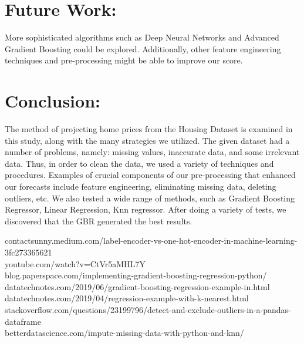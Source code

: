 \documentclass[10pt,twocolumn,letterpaper]{article}
\begin{document}
\section{Future Work:}
More sophisticated algorithms such as Deep Neural Networks and Advanced Gradient Boosting could be explored. Additionally, other feature engineering techniques and pre-processing might be able to improve our score. 


\section{Conclusion:}
The method of projecting home prices from the Housing Dataset is examined in this study, along with the many strategies we utilized. The given dataset had a number of problems, namely: missing values, inaccurate data, and some irrelevant data. Thus, in order to clean the data, we used a variety of techniques and procedures. Examples of crucial components of our pre-processing that enhanced our forecasts include feature engineering, eliminating missing data, deleting outliers, etc. We also tested a wide range of methods, such as Gradient Boosting Regressor, Linear Regression, Knn regressor. After doing a variety of tests, we discovered that the GBR generated the best results. 



contactsunny.medium.com/label-encoder-vs-one-hot-encoder-in-machine-learning-3fc273365621\\

youtube.com/watch?v=CtVr5aMHL7Y\\

blog.paperspace.com/implementing-gradient-boosting-regression-python/\\

datatechnotes.com/2019/06/gradient-boosting-regression-example-in.html\\

datatechnotes.com/2019/04/regression-example-with-k-nearest.html\\

stackoverflow.com/questions/23199796/detect-and-exclude-outliers-in-a-pandas-dataframe\\

betterdatascience.com/impute-missing-data-with-python-and-knn/
\end{document}
